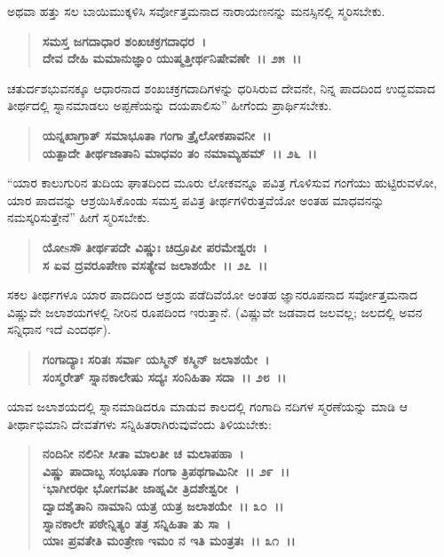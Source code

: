 ಅಥವಾ ಹತ್ತು ಸಲ ಬಾಯಿಮುಕ್ಕಳಿಸಿ ಸರ್ವೋತ್ತಮನಾದ ನಾರಾಯಣನನ್ನು ಮನಸ್ಸಿನಲ್ಲಿ ಸ್ಮರಿಸಬೇಕು.

\begin{verse}
\textbf{ಸಮಸ್ತ ಜಗದಾಧಾರ ಶಂಖಚಕ್ರಗದಾಧರ~।}\\\textbf{ದೇವ ದೇಹಿ ಮಮಾನುಜ್ಞಾಂ ಯುಷ್ಮತ್ತೀರ್ಥನಿಷೇವಣೇ~।। ೨೫~।।}
\end{verse}

ಚತುರ್ದಶಭುವನಕ್ಕೂ ಆಧಾರನಾದ ಶಂಖಚಕ್ರಗದಾದಿಗಳನ್ನು ಧರಿಸಿರುವ ದೇವನೇ, ನಿನ್ನ ಪಾದದಿಂದ ಉದ್ಭವವಾದ ತೀರ್ಥದಲ್ಲಿ ಸ್ನಾನಮಾಡಲು ಅಪ್ಪಣೆಯನ್ನು ದಯಪಾಲಿಸು” ಹೀಗೆಂದು ಪ್ರಾರ್ಥಿಸಬೇಕು.

\begin{verse}
\textbf{ಯನ್ನಖಾಗ್ರಾತ್ ಸಮಾಭೂತಾ ಗಂಗಾ ತ್ರೈಲೋಕಪಾವನೀ~।।}\\\textbf{ಯತ್ಪಾದೇ ತೀರ್ಥಜಾತಾನಿ ಮಾಧವಂ ತಂ ನಮಾಮ್ಯಹಮ್~।। ೨೬~।।}
\end{verse}

“ಯಾರ ಕಾಲುಗುರಿನ ತುದಿಯ ಘಾತದಿಂದ ಮೂರು ಲೋಕವನ್ನೂ ಪವಿತ್ರ ಗೊಳಿಸುವ ಗಂಗೆಯು ಹುಟ್ಟಿರುವಳೋ, ಯಾರ ಪಾದವನ್ನು ಆಶ್ರಯಿಸಿಕೊಂಡು ಸಮಸ್ತ ಪವಿತ್ರ ತೀರ್ಥಗಳಿರುತ್ತವೆಯೋ ಅಂತಹ ಮಾಧವನನ್ನು ನಮಸ್ಕರಿಸುತ್ತೇನೆ” ಹೀಗೆ ಸ್ಮರಿಸಬೇಕು.

\begin{verse}
\textbf{ಯೋsಸೌ ತೀರ್ಥಪದೇ ವಿಷ್ಣುಃ ಚಿದ್ರೂಪೀ ಪರಮೇಶ್ವರಃ~।}\\\textbf{ಸ ಏವ ದ್ರವರೂಪೇಣ ವಸತ್ಯೇವ ಜಲಾಶಯೇ~।। ೨೭~।।}
\end{verse}

ಸಕಲ ತೀರ್ಥಗಳೂ ಯಾರ ಪಾದದಿಂದ ಆಶ್ರಯ ಪಡೆದಿವೆಯೋ ಅಂತಹ ಜ್ಞಾನರೂಪನಾದ ಸರ್ವೋತ್ತಮನಾದ ವಿಷ್ಣುವೇ ಜಲಾಶಯಗಳಲ್ಲಿ ನೀರಿನ ರೂಪದಿಂದ ಇರುತ್ತಾನೆ. (ವಿಷ್ಣುವೇ ಜಡವಾದ ಜಲವಲ್ಲ; ಜಲದಲ್ಲಿ ಅವನ ಸನ್ನಿಧಾನ ಇದೆ ಎಂದರ್ಥ).

\begin{verse}
\textbf{ಗಂಗಾದ್ಯಾಃ ಸರಿತಃ ಸರ್ವಾ ಯಸ್ಮಿನ್ ಕಸ್ಮಿನ್ ಜಲಾಶಯೇ~।}\\\textbf{ಸಂಸ್ಮರೇತ್ ಸ್ನಾನಕಾಲೇಷು ಸದ್ಯಃ ಸಂನಿಹಿತಾ ಸದಾ~।। ೨೮~।।}
\end{verse}

ಯಾವ ಜಲಾಶಯದಲ್ಲಿ ಸ್ನಾನಮಾಡಿದರೂ ಮಾಡುವ ಕಾಲದಲ್ಲಿ ಗಂಗಾದಿ ನದಿಗಳ ಸ್ಮರಣೆಯನ್ನು ಮಾಡಿ ಆ ತೀರ್ಥಾಭಿಮಾನಿ ದೇವತೆಗಳು ಸನ್ನಿಹಿತರಾಗಿರುವುವೆಂದು ತಿಳಿಯಬೇಕು:

\begin{verse}
\textbf{ನಂದಿನೀ ನಲಿನೀ ಸೀತಾ ಮಾಲತೀ ಚ ಮಲಾಪಹಾ~।}\\\textbf{ವಿಷ್ಣು ಪಾದಾಬ್ಬ ಸಂಭೂತಾ ಗಂಗಾ ತ್ರಿಪಥಗಾಮಿನೀ~।। ೨೯~।।}\\\textbf{`ಭಾಗೀರಥೀ ಭೋಗವತೀ ಜಾಹ್ನವೀ ತ್ರಿದಶೇಶ್ವರೀ~।}\\\textbf{ದ್ವಾದಶೈತಾನಿ ನಾಮಾನಿ ಯತ್ರ ಯತ್ರ ಜಲಾಶಯೇ~।। ೩೦~।।}\\\textbf{ಸ್ನಾನಕಾಲೇ ಪಠೇನ್ನಿತ್ಯಂ ತತ್ರ ಸನ್ನಿಹಿತಾ ತು ಸಾ~।}\\\textbf{ಯಾಃ ಪ್ರವತೇತಿ ಮಂತ್ರೇಣ ಇಮಂ ನ ಇತಿ ಮಂತ್ರತಃ~।। ೩೧~।।}
\end{verse}

